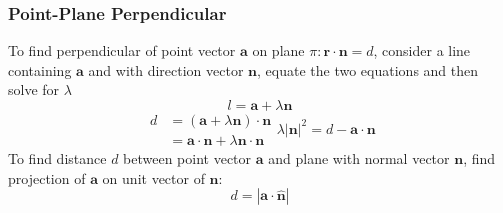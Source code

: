 \documentclass[../main]{subfiles}
\begin{document}
	\subsubsection{Point-Plane Perpendicular}
	To find perpendicular of point vector \(\mathbf{a}\) on plane \( \pi : \mathbf{r} \cdot \mathbf{n} = d \), consider a line containing \(\mathbf{a}\) and with direction vector \(\mathbf{n}\), equate the two equations and then solve for \(\lambda\)
	\[ l = \mathbf{a} + \lambda \mathbf{n} \]
	\begin{equation*}
		\begin{split}
		d & = (\mathbf{a} + \lambda \mathbf{n}) \cdot \mathbf{n} \\
		  & = \mathbf{a} \cdot \mathbf{n} + \lambda \mathbf{n} \cdot \mathbf{n}
		\end{split}
		\lambda | \mathbf{n} |^2 = d - \mathbf{a} \cdot \mathbf{n}
	\end{equation*}
	To find distance \(d\) between point vector \(\mathbf{a}\) and plane with normal vector \(\mathbf{n}\), find projection of \(\mathbf{a}\) on unit vector of \(\mathbf{n}\):
	\[ d = |\mathbf{a} \cdot \mathbf{\hat{n}}| \]
\end{document}
